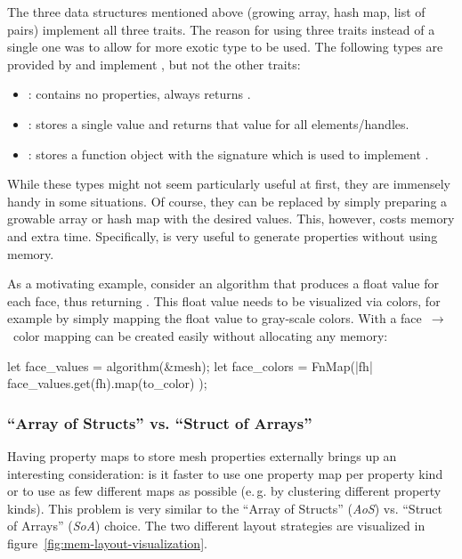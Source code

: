 The three data structures mentioned above (growing array, hash map, list of pairs) implement all three traits.
The reason for using three traits instead of a single one was to allow for more exotic type to be used.
The following types are provided by  and implement , but not the other traits:

\begin{itemize}
\item {}: contains no properties, always returns .
\item {}: stores a single value and returns that value for all elements/handles.
\item {}: stores a function object with the signature  which is used to implement .
\end{itemize}

While these types might not seem particularly useful at first, they are immensely handy in some situations.
Of course, they can be replaced by simply preparing a growable array or hash map with the desired values.
This, however, costs memory and extra time.
Specifically,  is very useful to generate properties without using memory.

As a motivating example, consider an algorithm that produces a float value for each face, thus returning .
This float value needs to be visualized via colors, for example by simply mapping the float value to gray-scale colors.
With  a face~$\rightarrow$~color mapping can be created easily without allocating any memory:

\begin{center}
  \begin{minipage}{.59\textwidth}
    \begin{rustcode}
      let face_values = algorithm(&mesh);
      let face_colors = FnMap(|fh| {
          face_values.get(fh).map(to_color)
      });
    \end{rustcode}
  \end{minipage}
\end{center}


\subsubsection*{\enquote{Array of Structs} vs. \enquote{Struct of Arrays}}

Having property maps to store mesh properties externally brings up an interesting consideration: is it faster to use one property map per property kind or to use as few different maps as possible (e.\,g. by clustering different property kinds).
This problem is very similar to the \enquote{Array of Structs} (\emph{AoS}) vs. \enquote{Struct of Arrays} (\emph{SoA}) choice.
The two different layout strategies are visualized in figure~\ref{fig:mem-layout-visualization}.


